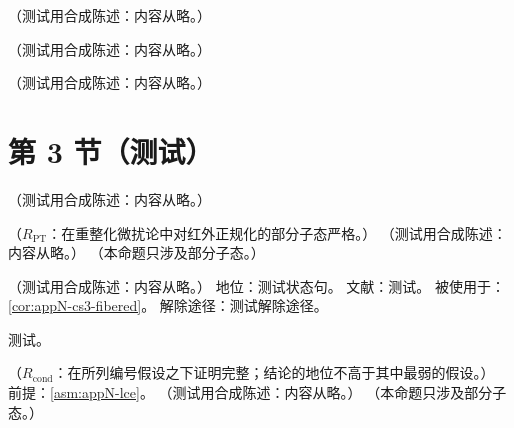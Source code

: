 \begin{definition}\label{def:appN-fibered}
（测试用合成陈述：内容从略。）
\end{definition}

\begin{theorem}[纤维化减除定理]\label{thm:appN-fibered-subtraction}
（测试用合成陈述：内容从略。）
\end{theorem}

\begin{lemma}\label{lem:appN-identification}
（测试用合成陈述：内容从略。）
\end{lemma}

\section{第 3 节（测试）}\label{sec:appN-theorem}

\begin{lemma}[热带/线性规划证书]\label{lem:appN-lp-certificate}
（测试用合成陈述：内容从略。）
\end{lemma}

\begin{lemma}\label{lem:appN-lc-positivity}
（$R_{\mathrm{PT}}$：在重整化微扰论中对红外正规化的部分子态严格。）
（测试用合成陈述：内容从略。）
（本命题只涉及部分子态。）
\end{lemma}

\begin{assumption}\label{asm:appN-lce}
（测试用合成陈述：内容从略。）
地位：测试状态句。
文献：测试。
被使用于：\cref{cor:appN-cs3-fibered}。
解除途径：测试解除途径。
\end{assumption}
\begin{proofsketch}测试。\end{proofsketch}

\begin{corollary}\label{cor:appN-cs3-fibered}
（$R_{\mathrm{cond}}$：在所列编号假设之下证明完整；结论的地位不高于其中最弱的假设。）
前提：\cref{asm:appN-lce}。
（测试用合成陈述：内容从略。）
（本命题只涉及部分子态。）
\end{corollary}

